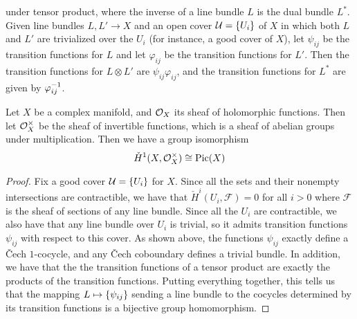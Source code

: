 under tensor product, where the inverse of a line bundle $L$ is the dual bundle
$L^*$. Given line bundles $L,L' \to X$ and an open cover $\mathcal{U} = \left\lbrace U_i \right\rbrace$ of $X$
in which both $L$ and $L'$ are trivialized over the $U_i$ (for instance, a good cover
of $X$), let $\psi_{ij}$ be the transition functions for $L$ and let $\varphi_{ij}$
be the transition functions for $L'$. Then the transition functions for $L\otimes L'$
are $\psi_{ij}\varphi_{ij}$, and the transition functions for $L^*$ are given
by $\varphi_{ij}^{-1}$.
%
\begin{thm}
Let $X$ be a complex manifold, and $\mathcal{O}_X$ its sheaf of holomorphic functions.
Then let $\mathcal{O}_X^\times$ be the sheaf of invertible functions, which is a
sheaf of abelian groups under multiplication. Then we have a group isomorphism
\[
\check{H}^1(X,\mathcal{O}_X^\times) \cong \mathrm{Pic}(X)
\]
\end{thm}
%
\begin{proof}
Fix a good cover $\mathcal{U} = \left\lbrace U_i \right\rbrace$ for $X$. Since all the sets and their
nonempty intersections are contractible, we have that
$\check{H}^i(U_i, \mathcal{F}) = 0$ for all $i > 0$ where $\mathcal{F}$ is the sheaf
of sections of any line bundle. Since all the $U_i$ are contractible, we also
have that any line bundle over $U_i$ is trivial, so it admits transition
functions $\psi_{ij}$ with respect to this cover. As shown above, the
functions $\psi_{ij}$ exactly define a \v{C}ech $1$-cocycle, and any
\v{C}ech coboundary defines a trivial bundle. In addition, we have that
the the transition functions of a tensor product are exactly the products
of the transition functions. Putting everything together, this tells us that
the mapping $L \mapsto \left\lbrace \psi_{ij} \right\rbrace$ sending a line bundle to the cocycles
determined by its transition functions is a bijective group homomorphism.
\end{proof}
%